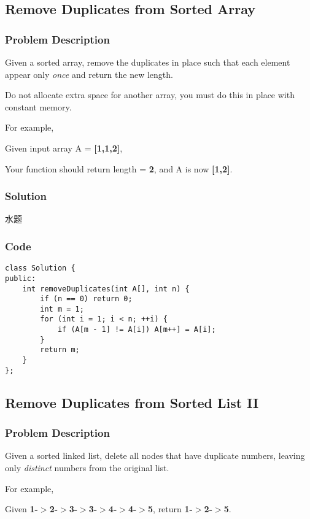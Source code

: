 \documentclass[courier]{article}
\begin{document}
\begin{CJK*}{UTF8}{gkai}
\subsection{ Remove Duplicates from Sorted Array }

\subsubsection*{Problem Description}
Given a sorted array, remove the duplicates in place such that each element appear only \emph{once} and return the new length.

Do not allocate extra space for another array, you must do this in place with constant memory.

For example,


Given input array A = \textbf{[1,1,2]},

Your function should return length = \textbf{2}, and A is now \textbf{[1,2]}.



\subsubsection*{Solution}
水题

\subsubsection*{Code}
\begin{lstlisting}
class Solution {
public:
    int removeDuplicates(int A[], int n) {
        if (n == 0) return 0;
        int m = 1;
        for (int i = 1; i < n; ++i) {
            if (A[m - 1] != A[i]) A[m++] = A[i];
        }
        return m;
    }
}; 
\end{lstlisting}


\subsection{ Remove Duplicates from Sorted List II }

\subsubsection*{Problem Description}
Given a sorted linked list, delete all nodes that have duplicate numbers, leaving only \emph{distinct} numbers from the original list.

For example,


Given \textbf{1-$>$2-$>$3-$>$3-$>$4-$>$4-$>$5}, return \textbf{1-$>$2-$>$5}.



\end{CJK*}
\end{document}
